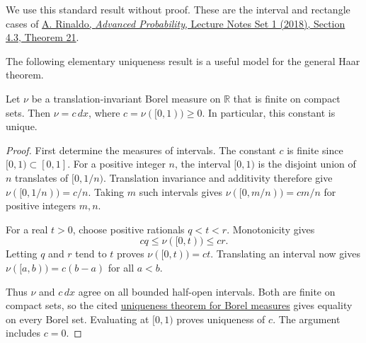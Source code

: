 We use this standard result without proof. These are the interval and rectangle cases of \href{https://stat.cmu.edu/~arinaldo/Teaching/36752/S18/Notes/lec_notes_1.pdf\#page=10}{A. Rinaldo, \emph{Advanced Probability}, Lecture Notes Set 1 (2018), Section 4.3, Theorem 21}.

The following elementary uniqueness result is a useful model for the general Haar theorem.

\begin{lemma}\label{measure.translation-invariant-line}
Let $\nu$ be a translation-invariant Borel measure on $\mathbb R$ that is finite on compact sets. Then $\nu=c\,dx$, where $c=\nu([0,1))\geq0$. In particular, this constant is unique.
\end{lemma}

\begin{proof}
First determine the measures of intervals. The constant $c$ is finite since $[0,1)\subset[0,1]$. For a positive integer $n$, the interval $[0,1)$ is the disjoint union of $n$ translates of $[0,1/n)$. Translation invariance and additivity therefore give $\nu([0,1/n))=c/n$. Taking $m$ such intervals gives $\nu([0,m/n))=cm/n$ for positive integers $m,n$.

For a real $t>0$, choose positive rationals $q<t<r$. Monotonicity gives
\[
 cq\leq\nu([0,t))\leq cr.
\]
Letting $q$ and $r$ tend to $t$ proves $\nu([0,t))=ct$. Translating an interval now gives $\nu([a,b))=c(b-a)$ for all $a<b$.

Thus $\nu$ and $c\,dx$ agree on all bounded half-open intervals. Both are finite on compact sets, so the cited \hyperref[measure.uniqueness-principle]{uniqueness theorem for Borel measures} gives equality on every Borel set. Evaluating at $[0,1)$ proves uniqueness of $c$. The argument includes $c=0$.
\end{proof}
